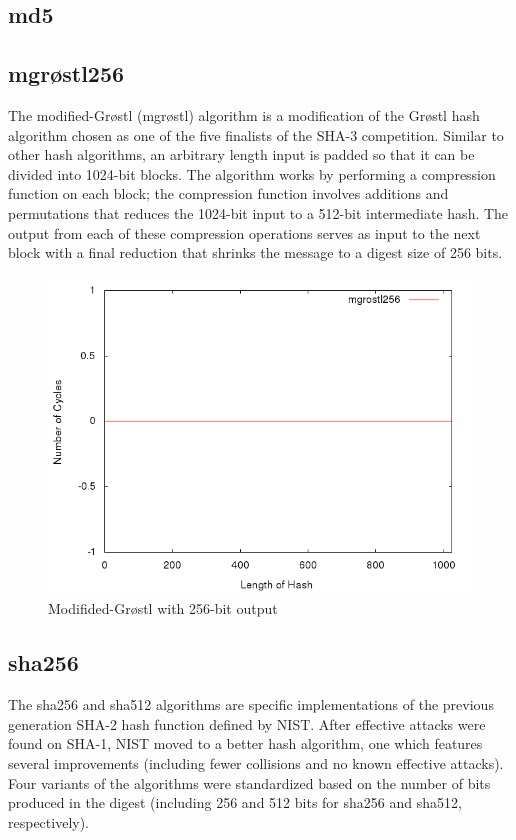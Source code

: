 \documentclass[10pt,a4paper]{article}
\begin{document}
\subsection{md5}


\subsection{mgr{\o}stl256}
The modified-Gr{\o}stl (mgr{\o}stl) algorithm is a modification of the Gr{\o}stl hash algorithm chosen as one of the five finalists of the SHA-3 competition.  Similar to other hash algorithms, an arbitrary length input is padded so that it can be divided into 1024-bit blocks.  The algorithm works by performing a compression function on each block; the compression function involves additions and permutations that reduces the 1024-bit input to a 512-bit intermediate hash.  The output from each of these compression operations serves as input to the next block with a final reduction that shrinks the message to a digest size of 256 bits. 

    \begin{figure}[H]
        \begin{center}
            \includegraphics[scale=0.5]{images/mgrostl256.png} 
            \caption{Modifided-Gr{\o}stl with 256-bit output}
        \end{center}
    \end{figure}

\subsection{sha256}
The sha256 and sha512 algorithms are specific implementations of the previous generation SHA-2 hash function defined by NIST.  After effective attacks were found on SHA-1, NIST moved to a better hash algorithm, one which features several improvements (including fewer collisions and no known effective attacks).  Four variants of the algorithms were standardized based on the number of bits produced in the digest (including 256 and 512 bits for sha256 and sha512, respectively).
\end{document}
